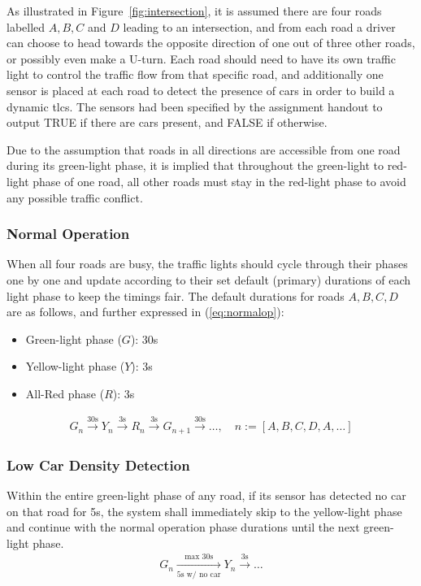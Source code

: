 As illustrated in Figure~\ref{fig:intersection}, it is assumed there are four roads labelled $A,B,C$ and $D$ leading to an intersection, and from each road a driver can choose to head towards the opposite direction of one out of three other roads, or possibly even make a U-turn. Each road should need to have its own traffic light to control the traffic flow from that specific road, and additionally one sensor is placed at each road to detect the presence of cars in order to build a dynamic \acs{tlcs}. The sensors had been specified by the assignment handout to output TRUE if there are cars present, and FALSE if otherwise.

Due to the assumption that roads in all directions are accessible from one road during its green-light phase, it is implied that throughout the green-light to red-light phase of one road, all other roads must stay in the red-light phase to avoid any possible traffic conflict.
\subsubsection{Normal Operation}
When all four roads are busy, the traffic lights should cycle through their phases one by one and update according to their set default (primary) durations of each light phase to keep the timings fair. The default durations for roads $A,B,C,D$ are as follows, and further expressed in (\ref{eq:normalop}):
\begin{itemize}
	\item Green-light phase ($G$): 30\unit{\second}
	\item Yellow-light phase ($Y$): 3\unit{\second}
	\item All-Red phase ($R$): 3\unit{\second}
\end{itemize}
\begin{align}
	G_n\xrightarrow{30\unit{\second}}Y_n\xrightarrow{3\unit{\second}}R_n\xrightarrow{3\unit{\second}}G_{n+1}\xrightarrow{30\unit{\second}}\dots,\quad{}n:=[A,B,C,D,A,\dots] \label{eq:normalop}
\end{align}
\subsubsection{Low Car Density Detection}
Within the entire green-light phase of any road, if its sensor has detected no car on that road for 5\unit{\second}, the system shall immediately skip to the yellow-light phase and continue with the normal operation phase durations until the next green-light phase.
\begin{align}
	G_n\xrightarrow[5\unit{\second}\text{ w/ no car}]{\text{max }30\unit{\second}}Y_n\xrightarrow{3\unit{\second}}\dots
\end{align}
